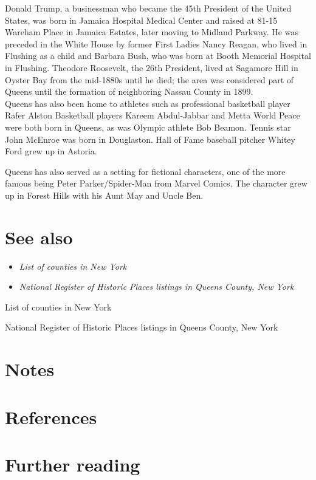 Donald Trump, a businessman who became the 45th President of the United
States, was born in Jamaica Hospital Medical Center and raised at 81-15
Wareham Place in Jamaica Estates, later moving to Midland Parkway. He
was preceded in the White House by former First Ladies Nancy Reagan, who
lived in Flushing as a child and Barbara Bush, who was born at Booth
Memorial Hospital in Flushing. Theodore Roosevelt, the 26th President,
lived at Sagamore Hill in Oyster Bay from the mid-1880s until he died;
the area was considered part of Queens until the formation of
neighboring Nassau County in 1899.\\
Queens has also been home to athletes such as professional basketball
player Rafer Alston Basketball players Kareem Abdul-Jabbar and Metta
World Peace were both born in Queens, as was Olympic athlete Bob Beamon.
Tennis star John McEnroe was born in Douglaston. Hall of Fame baseball
pitcher Whitey Ford grew up in Astoria.

Queens has also served as a setting for fictional characters, one of the
more famous being Peter Parker/Spider-Man from Marvel Comics. The
character grew up in Forest Hills with his Aunt May and Uncle Ben.

\section{See also}\label{see-also}

\begin{itemize}
\item
  \emph{List of counties in New York}
\item
  \emph{National Register of Historic Places listings in Queens County,
  New York}
\end{itemize}

List of counties in New York

National Register of Historic Places listings in Queens County, New York

\section{Notes}\label{notes}

\section{References}\label{references}

\section{Further reading}\label{further-reading}

